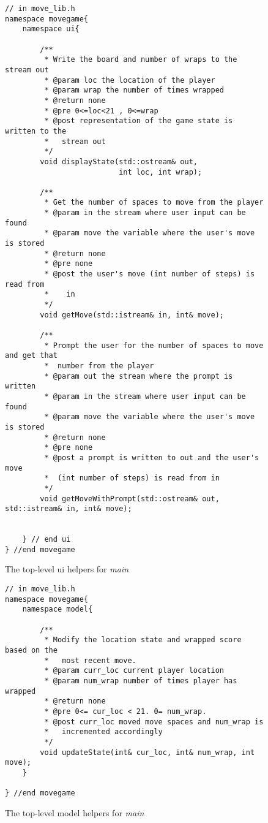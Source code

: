 \documentclass[nobib]{tufte-handout}
\begin{document}
\begin{figure}[!htbp]
\begin{lstlisting}
// in move_lib.h
namespace movegame{
	namespace ui{

		/**
		 * Write the board and number of wraps to the stream out
		 * @param loc the location of the player
		 * @param wrap the number of times wrapped
		 * @return none
		 * @pre 0<=loc<21 , 0<=wrap
		 * @post representation of the game state is written to the
		 *   stream out
		 */
		void displayState(std::ostream& out,
						  int loc, int wrap);

		/**
		 * Get the number of spaces to move from the player
		 * @param in the stream where user input can be found
		 * @param move the variable where the user's move is stored
		 * @return none
		 * @pre none
		 * @post the user's move (int number of steps) is read from
		 *    in
		 */
		void getMove(std::istream& in, int& move);

		/**
		 * Prompt the user for the number of spaces to move and get that
		 *  number from the player
		 * @param out the stream where the prompt is written
		 * @param in the stream where user input can be found
		 * @param move the variable where the user's move is stored
		 * @return none
		 * @pre none
		 * @post a prompt is written to out and the user's move
		 *  (int number of steps) is read from in
		 */
		void getMoveWithPrompt(std::ostream& out, std::istream& in, int& move);


	} // end ui
} //end movegame
\end{lstlisting}
\caption{The top-level ui helpers for \textit{main}}
\label{fig:top1}
\end{figure}

\begin{figure}[!htbp]
\begin{lstlisting}
// in move_lib.h
namespace movegame{
	namespace model{

		/**
		 * Modify the location state and wrapped score based on the
		 *   most recent move.
		 * @param curr_loc current player location
		 * @param num_wrap number of times player has wrapped
		 * @return none
		 * @pre 0<= cur_loc < 21. 0= num_wrap.
		 * @post curr_loc moved move spaces and num_wrap is
		 *   incremented accordingly
		 */
		void updateState(int& cur_loc, int& num_wrap, int move);
	}

} //end movegame

\end{lstlisting}
\caption{The top-level model helpers for \textit{main}}
\label{fig:top2}
\end{figure}
\end{document}
